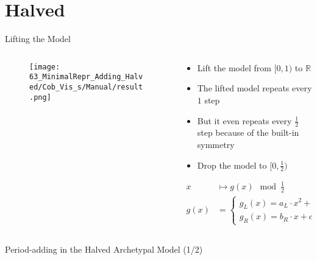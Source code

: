 \section{Halved}

\begin{frame}{Lifting the Model}
	\vspace{-1em}
	\begin{columns}
		\begin{column}{.4 \textwidth}
			\begin{figure}
				\texttt{[image: 63\_MinimalRepr\_Adding\_Halved/Cob\_Vis\_s/Manual/result.png]}
			\end{figure}
		\end{column}
		\begin{column}{.5 \textwidth}
			\pause
			\begin{itemize}
				\item Lift the model from $[0, 1)$ to $\mathbb{R}$ \pause
				\item The lifted model repeats every $1$ step \pause
				\item But it even repeats every $\frac{1}{2}$ step because of the built-in symmetry \pause
				\item Drop the model to $[0, \frac{1}{2})$ \pause
			\end{itemize}
			\begin{align*}
				x    & \mapsto g(x) \mod \frac{1}{2}                                              \\
				g(x) & = \begin{cases}
					         g_L(x) = a_L \cdot x^2 + b_L \cdot x + c_L & \text{ if } x < \frac{1}{4} \\
					         g_R(x) = b_R \cdot x + c_R                 & \text{ else}
				         \end{cases}
			\end{align*}
		\end{column}
	\end{columns}
\end{frame}

\begin{frame}{Period-adding in the Halved Archetypal Model (1/2)}
	\vspace{-1em}
	\begin{figure}
	\end{figure}
\end{frame}

